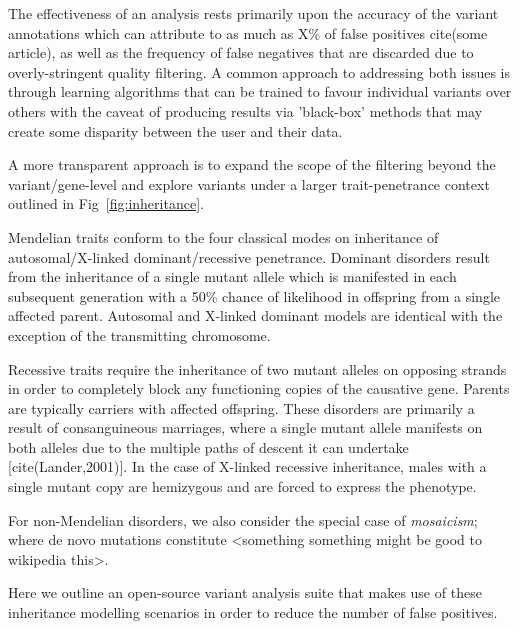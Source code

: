 The effectiveness of an analysis rests primarily upon the accuracy of the variant annotations which can attribute to as much as X\% of false positives cite(some article), as well as the frequency of false negatives that are discarded due to overly-stringent quality filtering. A common approach to addressing both issues is through learning algorithms that can be trained to favour individual variants over others with the caveat of producing results via 'black-box' methods that may create some disparity between the user and their data. 

A more transparent approach is to expand the scope of the filtering beyond the variant/gene-level and explore variants under a larger trait-penetrance context outlined in Fig~\ref{fig:inheritance}. 

Mendelian traits conform to the four classical modes on inheritance of autosomal/X-linked dominant/recessive penetrance. Dominant disorders result from the inheritance of a single mutant allele which is manifested in each subsequent generation with a 50\% chance of likelihood in offspring from a single affected parent. Autosomal and X-linked dominant models are identical with the exception of the transmitting chromosome.

Recessive traits require the inheritance of two mutant alleles on opposing strands in order to completely block any functioning copies of the causative gene. Parents are typically carriers with affected offspring. These disorders are primarily a result of consanguineous marriages, where a single mutant allele manifests on both alleles due to the multiple paths of descent it can undertake [cite(Lander,2001)]. In the case of X-linked recessive inheritance, males with a single mutant copy are hemizygous and are forced to express the phenotype.

For non-Mendelian disorders, we also consider the special case of \textit{mosaicism}; where de novo mutations constitute <something something might be good to wikipedia this>.

Here we outline an open-source variant analysis suite that makes use of these inheritance modelling scenarios in order to reduce the number of false positives.



